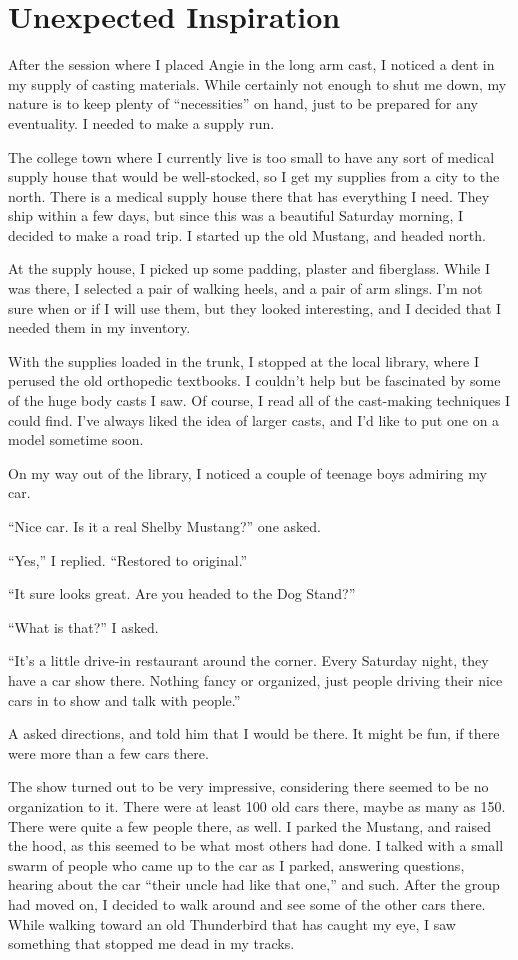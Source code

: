 \chapter{Unexpected Inspiration}
After the session where I placed Angie in the long arm cast, I noticed a dent in my supply
of casting materials. While certainly not enough to shut me down, my nature is to keep plenty of
``necessities'' on hand, just to be prepared for any eventuality. I needed to make a supply run.

The college town where I currently live is too small to have any sort of medical supply house
that would be well-stocked, so I get my supplies from a city to the north. There is a medical
supply house there that has everything I need. They ship within a few days, but since this was a
beautiful Saturday morning, I decided to make a road trip. I started up the old Mustang, and
headed north.

At the supply house, I picked up some padding, plaster and fiberglass. While I was there, I
selected a pair of walking heels, and a pair of arm slings. I'm not sure when or if I will use
them, but they looked interesting, and I decided that I needed them in my inventory.

With the supplies loaded in the trunk, I stopped at the local library, where I perused the old
orthopedic textbooks. I couldn't help but be fascinated by some of the huge body casts I saw. Of
course, I read all of the cast-making techniques I could find. I've always liked the idea of
larger casts, and I'd like to put one on a model sometime soon.

On my way out of the library, I noticed a couple of teenage boys admiring my car.

``Nice car. Is it a real Shelby Mustang?'' one asked.

``Yes,'' I replied. ``Restored to original.''

``It sure looks great. Are you headed to the Dog Stand?''

``What is that?'' I asked.

``It's a little drive-in restaurant around the corner. Every Saturday night, they have a car
show there. Nothing fancy or organized, just people driving their nice cars in to show and talk
with people.''


A asked directions, and told him that I would be there. It might be fun, if there were more than
a few cars there.


The show turned out to be very impressive, considering there seemed to be no organization to it.
There were at least 100 old cars there, maybe as many as 150. There were quite a few people
there, as well. I parked the Mustang, and raised the hood, as this seemed to be what most others
had done. I talked with a small swarm of people who came up to the car as I parked, answering
questions, hearing about the car ``their uncle had like that one,'' and such. After the group
had moved on, I decided to walk around and see some of the other cars there. While walking
toward an old Thunderbird that has caught my eye, I saw something that stopped me dead in my
tracks.

